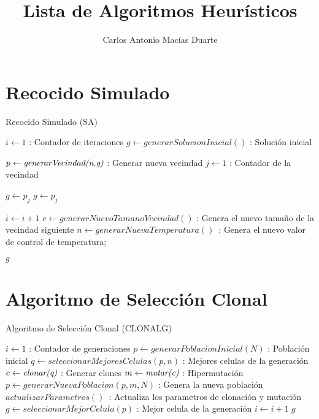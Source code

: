 \documentclass[10pt,letterpaper,twoside,openright]{article}
\author{Carlos Antonio Macías Duarte}
\title{Lista de Algoritmos Heurísticos}
\begin{document}
	\maketitle
			
	\section{Recocido Simulado}
	
		\begin{algorithm}[H]
			\caption{Recocido Simulado (SA)}
				$ i \leftarrow 1 $ : Contador de iteraciones\;
				$ g \leftarrow generarSolucionInicial() $ : Solución inicial\;
				{
					$ p \leftarrow \emph{generarVecindad(n,g)}$ : Generar nueva vecindad\;
					$ j \leftarrow 1 $ : Contador de la vecindad\;
					{
						{
							$ g \leftarrow p_{j} $\;
						}
						{
							$ g \leftarrow p_{j} $\;
						}
						
					}			
					$ i \leftarrow  i + 1 $\;
					$ c \leftarrow  generarNuevoTamanoVecindad() $ : Genera el nuevo tamaño de la vecindad siguiente\;
					$ n \leftarrow  generarNuevaTemperatura() $\ :  Genera el nuevo valor de control de temperatura;
				}
		 		\Return $ g $
		 \end{algorithm}
		 
			
	\section{Algoritmo de Selección Clonal}
	
		\begin{algorithm}[H]
			\caption{Algoritmo de Selección Clonal (CLONALG)}
				$ i \leftarrow 1 $ : Contador de generaciones\;
				$ p \leftarrow generarPoblacionInicial(N) $ : Población inicial\;
				{
					$ q \leftarrow seleccionarMejoresCelulas(p, n) $ : Mejores celulas de la generación\;
					$ c \leftarrow \emph{clonar(q)}$ : Generar clones\;
					$ m \leftarrow \emph{mutar(c)}$ : Hipermutación\;
					$ p \leftarrow  generarNuevaPoblacion(p, m, N) $ : Genera la nueva población\;
					$actualizarParametros() $\ :  Actualiza los parametros de clonación y mutación\;
					$ g \leftarrow seleccionarMejorCelula(p) $ : Mejor celula de la generación\;
					$ i \leftarrow  i + 1 $\;
				}
		 		\Return $ g $
		 \end{algorithm}
	
\end{document}

